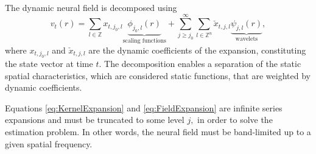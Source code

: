 \documentclass[review,authoryear,3p]{elsarticle}
\begin{document}
The dynamic neural field is decomposed using
\begin{equation}
 v_t\left(r\right)=\sum_{l \in \mathbb{Z}}x_{t,j_{0},l} \underbrace{\phi_{j_0,l}\left(r\right)}_{\text{scaling functions}} + \sum_{j\geq j_0}^{\infty} \sum_{l \in \mathbb{Z}^n} \check{x}_{t,j,l} \underbrace{\psi_{j,l}\left(r\right)}_{\text{wavelets}},
\label{eq:FieldExpansion}
\end{equation}
where $x_{t,j_{0},l}$ and $\check{x}_{t,j,l} $ are the dynamic coefficients of the expansion, constituting the state vector at time $t$. The decomposition enables a separation of the static spatial characteristics, which are considered static functions, that are weighted by dynamic coefficients.

Equations \ref{eq:KernelExpansion} and \ref{eq:FieldExpansion} are infinite series expansions and must be truncated to some level $j,$ in order to solve the estimation problem. In other words, the neural field must be band-limited up to a given spatial frequency. 
\end{document}
